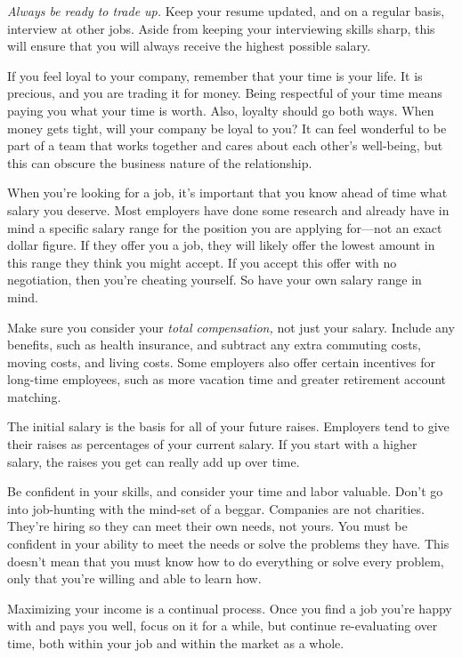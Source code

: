 \emph{Always be ready to trade up.} Keep your resume updated, and on a regular basis, interview at other jobs. Aside from keeping your interviewing skills sharp, this will ensure that you will always receive the highest possible salary.

If you feel loyal to your company, remember that your time is your life. It is precious, and you are trading it for money. Being respectful of your time means paying you what your time is worth. Also, loyalty should go both ways. When money gets tight, will your company be loyal to you? It can feel wonderful to be part of a team that works together and cares about each other's well-being, but this can obscure the business nature of the relationship.

When you're looking for a job, it's important that you know ahead of time what salary you deserve. Most employers have done some research and already have in mind a specific salary range for the position you are applying for—not an exact dollar figure. If they offer you a job, they will likely offer the lowest amount in this range they think you might accept. If you accept this offer with no negotiation, then you're cheating yourself. So have your own salary range in mind.

Make sure you consider your \emph{total compensation,} not just your salary. Include any benefits, such as health insurance, and subtract any extra commuting costs, moving costs, and living costs. Some employers also offer certain incentives for long-time employees, such as more vacation time and greater retirement account matching.

The initial salary is the basis for all of your future raises. Employers tend to give their raises as percentages of your current salary. If you start with a higher salary, the raises you get can really add up over time.

Be confident in your skills, and consider your time and labor valuable. Don't go into job-hunting with the mind-set of a beggar. Companies are not charities. They're hiring so they can meet their own needs, not yours. You must be confident in your ability to meet the needs or solve the problems they have. This doesn't mean that you must know how to do everything or solve every problem, only that you're willing and able to learn how.

Maximizing your income is a continual process. Once you find a job you're happy with and pays you well, focus on it for a while, but continue re-evaluating over time, both within your job and within the market as a whole.

